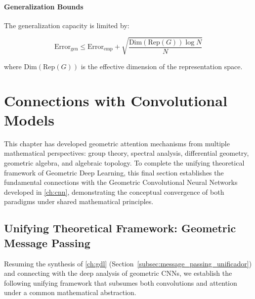 \paragraph{Generalization Bounds}

The generalization capacity is limited by:

\begin{equation}
\text{Error}_{\text{gen}} \leq \text{Error}_{\text{emp}} + \sqrt{\frac{\text{Dim}(\text{Rep}(G)) \log N}{N}}
\label{eq:geometric_generalization_bound}
\end{equation}

where $\text{Dim}(\text{Rep}(G))$ is the effective dimension of the representation space.

\section{Connections with Convolutional Models}\label{sec:cnn_attention_connections}

This chapter has developed geometric attention mechanisms from multiple mathematical perspectives: group theory, spectral analysis, differential geometry, geometric algebra, and algebraic topology. To complete the unifying theoretical framework of Geometric Deep Learning, this final section establishes the fundamental connections with the Geometric Convolutional Neural Networks developed in \autoref{ch:cnn}, demonstrating the conceptual convergence of both paradigms under shared mathematical principles.

\subsection{Unifying Theoretical Framework: Geometric Message Passing}\label{subsec:marco_teorico_unificador}

Resuming the synthesis of \autoref{ch:gdl} (Section~\ref{subsec:message_passing_unificador}) and connecting with the deep analysis of geometric CNNs, we establish the following unifying framework that subsumes both convolutions and attention under a common mathematical abstraction.

